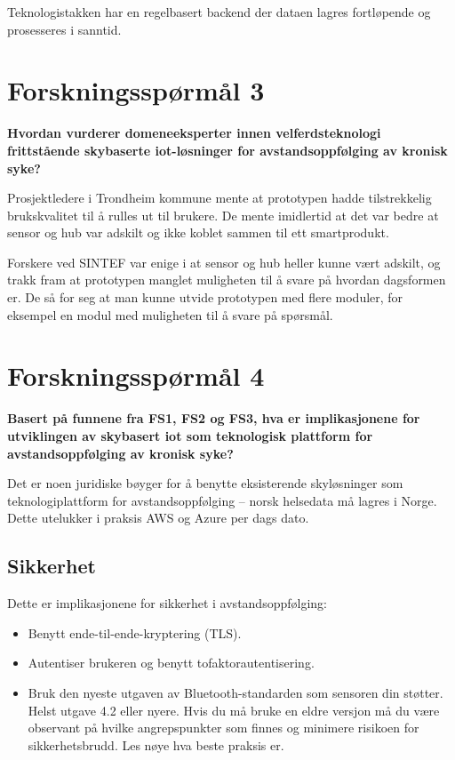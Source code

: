 Teknologistakken har en regelbasert backend der dataen lagres fortløpende og
prosesseres i sanntid.


\section{Forskningsspørmål 3}
\textbf{Hvordan vurderer domeneeksperter innen velferdsteknologi frittstående skybaserte \gls{iot}-løsninger
for avstandsoppfølging av kronisk syke?}

Prosjektledere i Trondheim kommune mente at prototypen hadde tilstrekkelig
brukskvalitet til å rulles ut til brukere. De mente imidlertid at det var bedre at
sensor og hub var adskilt og ikke koblet sammen til ett smartprodukt.

Forskere ved SINTEF var enige i at sensor og hub heller kunne vært adskilt, og trakk
fram at prototypen manglet muligheten til å svare på hvordan
dagsformen er. De så for seg at man kunne utvide prototypen med flere moduler,
for eksempel en modul med muligheten til å svare på spørsmål.

\section{Forskningsspørmål 4}
\textbf{Basert på funnene fra FS1, FS2 og FS3, hva er implikasjonene for utviklingen av skybasert \gls{iot} som teknologisk plattform
    for avstandsoppfølging av kronisk syke?}

Det er noen juridiske bøyger for å benytte eksisterende skyløsninger som teknologiplattform
for avstandsoppfølging -- norsk helsedata må lagres i Norge. Dette utelukker i
praksis AWS og Azure per dags dato.


\subsection{Sikkerhet} %
Dette er implikasjonene for sikkerhet i avstandsoppfølging:

\begin{itemize}
  \item Benytt ende-til-ende-kryptering (TLS).
  \item Autentiser brukeren og benytt tofaktorautentisering.
  \item Bruk den nyeste utgaven av Bluetooth-standarden som sensoren din
  støtter. Helst utgave 4.2 eller nyere. Hvis du må bruke en eldre versjon må
  du være observant på hvilke angrepspunkter som finnes og minimere risikoen for
  sikkerhetsbrudd. Les nøye hva beste praksis er.
\end{itemize}

